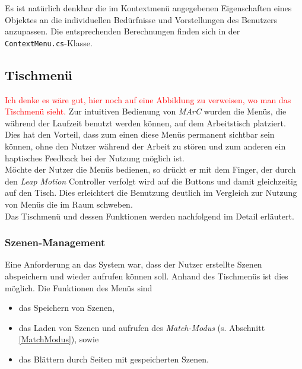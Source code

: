 Es ist natürlich denkbar die im Kontextmenü angegebenen Eigenschaften eines Objektes an die individuellen Bedürfnisse und Vorstellungen des Benutzers anzupassen. Die entsprechenden Berechnungen finden sich in der \texttt{ContextMenu.cs}-Klasse.

\subsection{Tischmenü}\label{sec:TableMenü}
\textcolor{red}{Ich denke es wäre gut, hier noch auf eine Abbildung zu verweisen, wo man das Tischmenü sieht.}
Zur intuitiven Bedienung von \textit{MArC} wurden die Menüs, die während der Laufzeit benutzt werden können, auf dem Arbeitstisch platziert. Dies hat den Vorteil, dass zum einen diese Menüs permanent sichtbar sein können, ohne den Nutzer während der Arbeit zu stören und zum anderen ein haptisches Feedback bei der Nutzung möglich ist.\\
Möchte der Nutzer die Menüs bedienen, so drückt er mit dem Finger, der durch den \textit{Leap Motion} Controller verfolgt wird auf die Buttons und damit gleichzeitig auf den Tisch. Dies erleichtert die Benutzung deutlich im Vergleich zur Nutzung von Menüs die im Raum schweben.\\
Das Tischmenü und dessen Funktionen werden nachfolgend im Detail erläutert.

\subsubsection{Szenen-Management}
Eine Anforderung an das System war, dass der Nutzer erstellte Szenen abspeichern und wieder aufrufen können soll. Anhand des Tischmenüs ist dies möglich. Die Funktionen des Menüs sind
\begin{itemize}
	\item das Speichern von Szenen,
	\item das Laden von Szenen und aufrufen des \textit{Match-Modus} (s. Abschnitt \ref{MatchModus}), sowie
	\item das Blättern durch Seiten mit gespeicherten Szenen.
\end{itemize}

